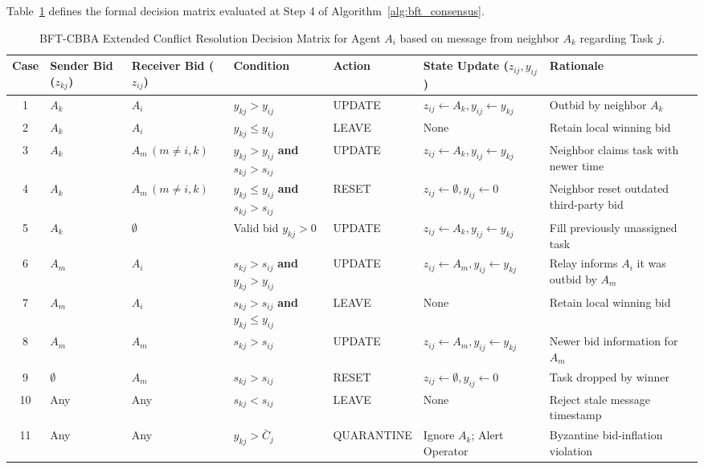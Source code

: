 \documentclass[journal,10pt,twocolumn]{IEEEtran}
\begin{document}
Table~\ref{tab:choi_table} defines the formal decision matrix evaluated at Step 4 of Algorithm~\ref{alg:bft_consensus}.

\begin{table}[t]
\centering
\caption{BFT-CBBA Extended Conflict Resolution Decision Matrix for Agent $A_i$ based on message from neighbor $A_k$ regarding Task $j$.}
\label{tab:choi_table}
\begin{tabular}{cllllll}
\toprule
\textbf{Case} & \textbf{Sender Bid ($z_{kj}$)} & \textbf{Receiver Bid ($z_{ij}$)} & \textbf{Condition} & \textbf{Action} & \textbf{State Update ($z_{ij}, y_{ij}$)} & \textbf{Rationale} \\
\midrule
1 & $A_k$ & $A_i$ & $y_{kj} > y_{ij}$ & UPDATE & $z_{ij} \gets A_k, y_{ij} \gets y_{kj}$ & Outbid by neighbor $A_k$ \\
2 & $A_k$ & $A_i$ & $y_{kj} \le y_{ij}$ & LEAVE & None & Retain local winning bid \\
3 & $A_k$ & $A_m \, (m \neq i, k)$ & $y_{kj} > y_{ij}$ \textbf{and} $s_{kj} > s_{ij}$ & UPDATE & $z_{ij} \gets A_k, y_{ij} \gets y_{kj}$ & Neighbor claims task with newer time \\
4 & $A_k$ & $A_m \, (m \neq i, k)$ & $y_{kj} \le y_{ij}$ \textbf{and} $s_{kj} > s_{ij}$ & RESET & $z_{ij} \gets \emptyset, y_{ij} \gets 0$ & Neighbor reset outdated third-party bid \\
5 & $A_k$ & $\emptyset$ & Valid bid $y_{kj} > 0$ & UPDATE & $z_{ij} \gets A_k, y_{ij} \gets y_{kj}$ & Fill previously unassigned task \\
6 & $A_m$ & $A_i$ & $s_{kj} > s_{ij}$ \textbf{and} $y_{kj} > y_{ij}$ & UPDATE & $z_{ij} \gets A_m, y_{ij} \gets y_{kj}$ & Relay informs $A_i$ it was outbid by $A_m$ \\
7 & $A_m$ & $A_i$ & $s_{kj} > s_{ij}$ \textbf{and} $y_{kj} \le y_{ij}$ & LEAVE & None & Retain local winning bid \\
8 & $A_m$ & $A_m$ & $s_{kj} > s_{ij}$ & UPDATE & $z_{ij} \gets A_m, y_{ij} \gets y_{kj}$ & Newer bid information for $A_m$ \\
9 & $\emptyset$ & $A_m$ & $s_{kj} > s_{ij}$ & RESET & $z_{ij} \gets \emptyset, y_{ij} \gets 0$ & Task dropped by winner \\
10 & Any & Any & $s_{kj} < s_{ij}$ & LEAVE & None & Reject stale message timestamp \\
11 & Any & Any & $y_{kj} > \bar{C}_j$ & QUARANTINE & Ignore $A_k$; Alert Operator & Byzantine bid-inflation violation \\
\bottomrule
\end{tabular}
\end{table}
\end{document}
